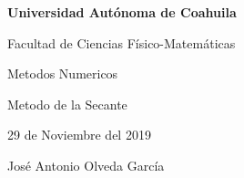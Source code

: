 \documentclass{article}
\begin{document}
\begin{center}
{\Large \textbf{Universidad Autónoma de Coahuila}}
\end{center}

\begin{center}
{\large Facultad de Ciencias Físico-Matemáticas}
\end{center}

\begin{center}
{\large Metodos Numericos}
\end{center}

\begin{center}
{\large Metodo de la Secante}
\end{center}

\begin{center}
{\large 29 de Noviembre del 2019}
\end{center}

\begin{center}
{\large José Antonio Olveda García}
\end{center}

\vspace{5mm}
\end{document}
